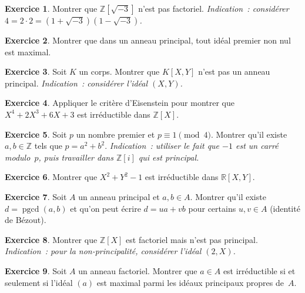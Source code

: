 \documentclass[12pt,a4paper,openany]{book}
\theoremstyle{definition}
\newtheorem{exercice}{Exercice}[chapter]
\newcommand{\Z}{\mathbb{Z}}
\newcommand{\R}{\mathbb{R}}
\DeclareMathOperator{\pgcd}{pgcd}
\begin{document}
\begin{exercice}\label{exo:fact-2}
Montrer que $\Z[\sqrt{-3}]$ n'est pas factoriel.
\emph{Indication~: considérer $4 = 2 \cdot 2
= (1 + \sqrt{-3})(1 - \sqrt{-3})$.}
\end{exercice}

\begin{exercice}\label{exo:fact-3}
Montrer que dans un anneau principal, tout idéal premier non nul est
maximal.
\end{exercice}

\begin{exercice}\label{exo:fact-4}
Soit $K$ un corps. Montrer que $K[X,Y]$ n'est pas un anneau principal.
\emph{Indication~: considérer l'idéal $(X, Y)$.}
\end{exercice}

\begin{exercice}\label{exo:fact-5}
Appliquer le critère d'Eisenstein pour montrer que $X^4 + 2X^3 + 6X + 3$
est irréductible dans $\Z[X]$.
\end{exercice}

\begin{exercice}\label{exo:fact-6}
Soit $p$ un nombre premier et $p \equiv 1 \pmod{4}$. Montrer qu'il
existe $a, b \in \Z$ tels que $p = a^2 + b^2$.
\emph{Indication~: utiliser le fait que $-1$ est un carré modulo~$p$,
puis travailler dans $\Z[i]$ qui est principal.}
\end{exercice}

\begin{exercice}\label{exo:fact-7}
Montrer que $X^2 + Y^2 - 1$ est irréductible dans $\R[X,Y]$.
\end{exercice}

\begin{exercice}\label{exo:fact-8}
Soit $A$ un anneau principal et $a, b \in A$. Montrer qu'il existe
$d = \pgcd(a,b)$ et qu'on peut écrire $d = ua + vb$ pour certains
$u, v \in A$ (identité de Bézout).
\end{exercice}

\begin{exercice}\label{exo:fact-9}
Montrer que $\Z[X]$ est factoriel mais n'est pas principal.
\emph{Indication~: pour la non-principalité, considérer l'idéal
$(2, X)$.}
\end{exercice}

\begin{exercice}\label{exo:fact-10}
Soit $A$ un anneau factoriel. Montrer que $a \in A$ est irréductible
si et seulement si l'idéal $(a)$ est maximal parmi les idéaux
principaux propres de~$A$.
\end{exercice}
\end{document}
